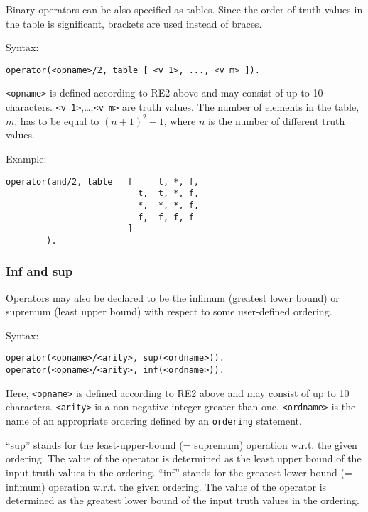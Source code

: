 \documentclass[
]{article}
\newcommand{\passthrough}[1]{#1}
\begin{document}
Binary operators can be also specified as tables. Since the order of
truth values in the table is significant, brackets are used instead of
braces.

Syntax:

\begin{lstlisting}
operator(<opname>/2, table [ <v 1>, ..., <v m> ]).
\end{lstlisting}

\passthrough{\lstinline!<opname>!} is defined according to RE2 above and
may consist of up to 10 characters.
\passthrough{\lstinline!<v 1>!},\ldots,\passthrough{\lstinline!<v m>!}
are truth values. The number of elements in the table, \(m\), has to be
equal to \((n+1)^2-1\), where \(n\) is the number of different truth
values.

Example:

\begin{lstlisting}
operator(and/2, table   [     t, *, f,
                          t,  t, *, f,
                          *,  *, *, f,
                          f,  f, f, f
                        ]
        ).
\end{lstlisting}

\hypertarget{inf-and-sup}{%
\subsubsection{Inf and sup}\label{inf-and-sup}}

Operators may also be declared to be the infimum (greatest lower bound)
or supremum (least upper bound) with respect to some user-defined
ordering.

Syntax:

\begin{lstlisting}
operator(<opname>/<arity>, sup(<ordname>)).
operator(<opname>/<arity>, inf(<ordname>)).
\end{lstlisting}

Here, \passthrough{\lstinline!<opname>!} is defined according to RE2
above and may consist of up to 10 characters.
\passthrough{\lstinline!<arity>!} is a non-negative integer greater than
one. \passthrough{\lstinline!<ordname>!} is the name of an appropriate
ordering defined by an \passthrough{\lstinline!ordering!} statement.

``sup'' stands for the least-upper-bound (= supremum) operation w.r.t.
the given ordering. The value of the operator is determined as the least
upper bound of the input truth values in the ordering. ``inf'' stands
for the greatest-lower-bound (= infimum) operation w.r.t. the given
ordering. The value of the operator is determined as the greatest lower
bound of the input truth values in the ordering.
\end{document}
